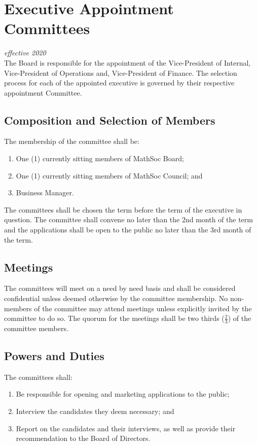 \section{Executive Appointment Committees}
\emph{effective 2020}\\

The Board is responsible for the appointment of the Vice-President of Internal, Vice-President of Operations and, Vice-President of Finance.  
The selection process for each of the appointed executive is governed by their respective appointment Committee. 

\subsection{Composition and Selection of Members}
The membership of the committee shall be:
\begin{enumerate}
    \item One (1) currently sitting members of MathSoc Board;
    \item One (1) currently sitting members of MathSoc Council; and
    \item Business Manager.
\end{enumerate}

The committees shall be chosen the term before the term of the executive in question. 
The committee shall convene no later than the 2nd month of the term and the applications shall be open to the public no later than the 3rd month of the term.

\subsection{Meetings}
The committees will meet on a need by need basis and shall be considered confidential unless deemed otherwise by the committee membership. 
No non-members of the committee may attend meetings unless explicitly invited by the committee to do so.
The quorum for the meetings shall be two thirds ($\frac{2}{3}$) of the committee members.

\subsection{Powers and Duties}

The committees shall: 
\begin{enumerate}
    \item Be responsible for opening and marketing applications to the public;
    \item Interview the candidates they deem necessary; and
    \item Report on the candidates and their interviews, as well as provide their recommendation to the Board of Directors. 
\end{enumerate}

